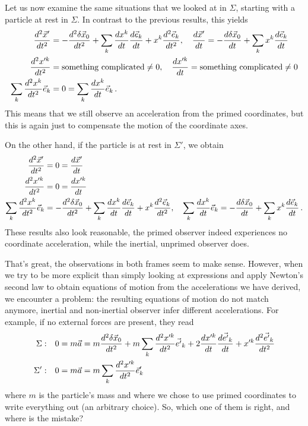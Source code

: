\documentclass[../class_mech_main.tex]{subfiles}
\begin{document}
\begin{itemize}
	Let us now examine the same situations that we looked at in $\Sigma$, starting with a particle at rest in $\Sigma$. In contrast to the previous results, this yields
	\begin{align*}
		\dv[2]{\vec{x}'}{t} &= -\dv[2]{\delta \vec{x}_0}{t} + \sum_k \dv{x^k}{t} \dv{\vec{e}_k}{t} + x^k \dv[2]{\vec{e}_k}{t},
		\quad \dv{\vec{x}'}{t} = -\dv{\delta \vec{x}_0}{t} + \sum_k x^k \dv{\vec{e}_k}{t}
		\\
		\dv[2]{x'^k}{t} &= \text{something complicated} \neq 0,
		\quad \dv{x'^k}{t} = \text{something complicated} \neq 0
		\\
		\sum_k \dv[2]{x^k}{t} \vec{e}_k &= 0 = \sum_k \dv{x^k}{t} \vec{e}_k \, .
	\end{align*}
	This means that we still observe an acceleration from the primed coordinates, but this is again just to compensate the motion of the coordinate axes.

	On the other hand, if the particle is at rest in $\Sigma'$, we obtain
	\begin{align*}
		\dv[2]{\vec{x}'}{t} &= 0 = \dv{\vec{x}'}{t}
		\\
		\dv[2]{x'^k}{t} &= 0 = \dv{x'^k}{t}
		\\
		\sum_k \dv[2]{x^k}{t} \vec{e}_k &= -\dv[2]{\delta \vec{x}_0}{t} + \sum_k \dv{x^k}{t} \dv{\vec{e}_k}{t} + x^k \dv[2]{\vec{e}_k}{t},
		\quad \sum_k \dv{x^k}{t} \vec{e}_k = -\dv{\delta \vec{x}_0}{t} + \sum_k x^k \dv{\vec{e}_k}{t} \, .
	\end{align*}
	These results also look reasonable, the primed observer indeed experiences no coordinate acceleration, while the inertial, unprimed observer does.
\end{itemize}

That's great, the observations in both frames seem to make sense. However, when we try to be more explicit than simply looking at expressions and apply Newton's second law to obtain equations of motion from the accelerations we have derived, we encounter a problem: the resulting equations of motion do not match anymore, inertial and non-inertial observer infer different accelerations. For example, if no external forces are present, they read
\begin{align}
	\Sigma: \quad & 0 = m \vec{a} = m \dv[2]{\delta \vec{x}_0}{t} + m \sum_k \dv[2]{x'^k}{t} \vec{e'}_k + 2 \dv{x'^k}{t} \dv{\vec{e'}_k}{t} + x'^k \dv[2]{\vec{e'}_k}{t}
	\label{eq:eqofmotion_from_accel_frame_in_inert_frame}
	\\
	\Sigma': \quad & 0 = m \vec{a} = m \sum_k \dv[2]{x'^k}{t} \vec{e}'_k
	\label{eq:eqofmotion_from_accel_frame_in_accel_frame}
\end{align}
where $m$ is the particle's mass and where we chose to use primed coordinates to write everything out (an arbitrary choice). So, which one of them is right, and where is the mistake?
\end{document}
